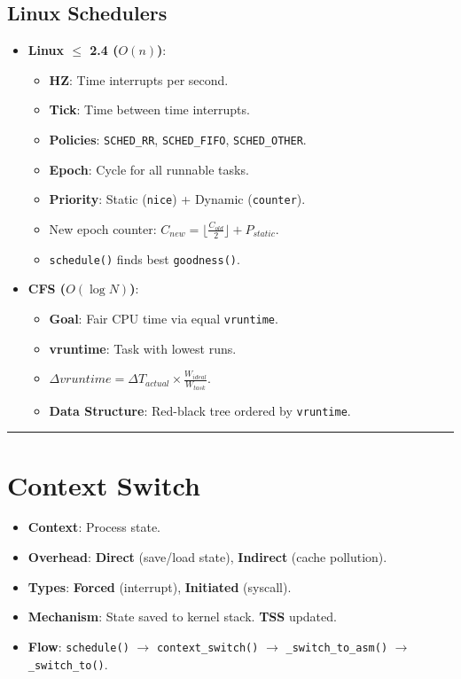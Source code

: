 \documentclass[8pt,a4paper]{article}
\newcommand{\sectiondivider}{\vspace{4pt}\hrule\vspace{4pt}}
\begin{document}
\begin{multicols}{2}
\subsection*{Linux Schedulers}
\begin{itemize}
    \item \textbf{Linux $\le$ 2.4 ($O(n)$)}:
    \begin{itemize}
        \item \textbf{HZ}: Time interrupts per second.
        \item \textbf{Tick}: Time between time interrupts.
        \item \textbf{Policies}: \texttt{SCHED\_RR}, \texttt{SCHED\_FIFO}, \texttt{SCHED\_OTHER}.
        \item \textbf{Epoch}: Cycle for all runnable tasks.
        \item \textbf{Priority}: Static (\texttt{nice}) + Dynamic (\texttt{counter}).
        \item New epoch counter: $C_{new} = \lfloor \frac{C_{old}}{2} \rfloor + P_{static}$.
        \item \texttt{schedule()} finds best \texttt{goodness()}.
    \end{itemize}
    \item \textbf{CFS ($O(\log N)$)}:
    \begin{itemize}
        \item \textbf{Goal}: Fair CPU time via equal \texttt{vruntime}.
        \item \textbf{vruntime}: Task with lowest runs.
        \item $\Delta vruntime = \Delta T_{actual} \times \frac{W_{ideal}}{W_{task}}$.
        \item \textbf{Data Structure}: Red-black tree ordered by \texttt{vruntime}.
    \end{itemize}
\end{itemize}

\sectiondivider
\section*{Context Switch}
\begin{itemize}
    \item \textbf{Context}: Process state.
    \item \textbf{Overhead}: \textbf{Direct} (save/load state), \textbf{Indirect} (cache pollution).
    \item \textbf{Types}: \textbf{Forced} (interrupt), \textbf{Initiated} (syscall).
    \item \textbf{Mechanism}: State saved to kernel stack. \textbf{TSS} updated.
    \item \textbf{Flow}: \texttt{schedule()} $\to$ \texttt{context\_switch()} $\to$ \texttt{\_switch\_to\_asm()} $\to$ \texttt{\_switch\_to()}.
\end{itemize}


\end{multicols}
\end{document}
